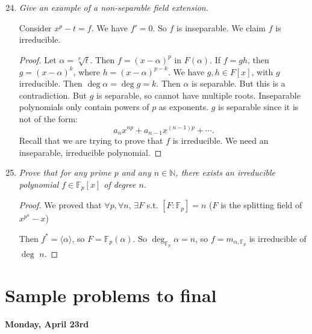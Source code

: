 \documentclass[9pt,reqno,twoside]{amsbook}
\theoremstyle{plain}
\numberwithin{section}{chapter}
\numberwithin{equation}{chapter}
\theoremstyle{definition}
\theoremstyle{remark}
\theoremstyle{plain}
\newcommand{\n}{\mathbb{N}}
\newcommand{\F}{\mathbb{F}}
\newcommand{\counter}{\setcounter}
\begin{document}
\begin{enumerate}[label=\arabic*.]
\counter{enumi}{23}
\item \textit{Give an example of a non-separable field extension. }

Consider $x^p - t = f$. We have $f' = 0$. So $f$ is inseparable. We claim $f$ is irreducible. 

\begin{proof}
Let $\alpha = \sqrt[p]{t}$. Then $f = (x - \alpha)^p$ in $F(\alpha)$. If $f = gh$, then $g = (x - \alpha)^k$, where $h = (x - \alpha)^{p - k}$. We have $g,h \in F[x]$, with $g$ irreducible. Then $\deg \alpha = \deg g = k$. Then $\alpha$ is separable. But this is a contradiction. But $g$ is separable, so cannot have multiple roots. Inseparable polynomials only contain powers of $p$ as exponents. $g$ is separable since it is not of the form:
$$
a_nx^{np} + a_{n - 1}x^{(n - 1)p} + \cdots.
$$
Recall that we are trying to prove that $f$ is irreducible. We need an inseparable, irreducible polynomial. 
\end{proof}


\counter{enumi}{25}
\item \textit{Prove that for any prime $p$ and any $n \in \n$, there exists an irreducible polynomial $f \in \F_p[x]$ of degree $n$. }

\begin{proof}
We proved that $\forall p, \forall n$, $\exists F$ s.t. $[F:\F_p] = n$ ($F$ is the splitting field of $x^{p^n} - x$)

Then $f^* = \langle \alpha \rangle$, so $F = \F_p(\alpha)$. So $\deg_{\F_p}\alpha = n$, so $f = m_{\alpha,\F_p}$ is irreducible of $\deg$ $n$. 
\end{proof}
\end{enumerate}





\chapter{Sample problems to final}

\textbf{Monday, April 23rd}
\end{document}
